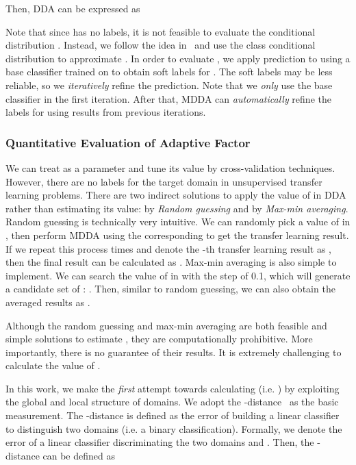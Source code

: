 \documentclass[acmsmall]{acmart}
\begin{document}
Then, DDA can be expressed as


Note that since  has no labels, it is not feasible to evaluate the conditional distribution . Instead, we follow the idea in~\cite{wang2017balanced} and use the class conditional distribution  to approximate . In order to evaluate , we apply prediction to  using a base classifier trained on  to obtain soft labels for . The soft labels may be less reliable, so we \textit{iteratively} refine the prediction. Note that we \textit{only} use the base classifier in the first iteration. After that, MDDA can \textit{automatically} refine the labels for  using results from previous iterations.

\subsubsection{Quantitative Evaluation of Adaptive Factor }

We can treat  as a parameter and tune its value by cross-validation techniques. However, there are no labels for the target domain in unsupervised transfer learning problems. There are two indirect solutions to apply the value of  in DDA rather than estimating its value: by \textit{Random guessing} and by \textit{Max-min averaging}. Random guessing is technically very intuitive. We can randomly pick a value of  in , then perform MDDA using the corresponding  to get the transfer learning result. If we repeat this process  times and denote the -th transfer learning result as , then the final result can be calculated as . Max-min averaging is also simple to implement. We can search the value of  in  with the step of 0.1, which will generate a candidate set of : . Then, similar to random guessing, we can also obtain the averaged results as .

Although the random guessing and max-min averaging are both feasible and simple solutions to estimate , they are computationally prohibitive. More importantly, there is no guarantee of their results. It is extremely challenging to calculate the value of .

In this work, we make the \textit{first} attempt towards calculating  (i.e. ) by exploiting the global and local structure of domains. We adopt the -distance~\cite{ben2007analysis} as the basic measurement. The -distance is defined as the error of building a linear classifier to distinguish two domains (i.e. a binary classification). Formally, we denote  the error of a linear classifier  discriminating the two domains  and . Then, the -distance can be defined as
\end{document}
